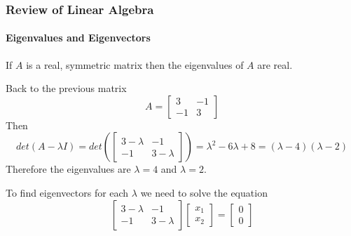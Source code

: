 \begin{frame}
\frametitle{Review of Linear Algebra}
\framesubtitle{Eigenvalues and Eigenvectors}
\begin{theorem}
If $A$ is a real, symmetric matrix then the eigenvalues of $A$ are real.
\end{theorem}
\begin{examp}
Back to the previous matrix
$$
A = \left[\begin{array}{rr}
3 & -1 \\ -1 & 3
\end{array}\right]
$$
Then
$$
det(A-\lambda I) = det( \left[\begin{array}{rr}
3 -\lambda & -1 \\ -1 & 3-\lambda
\end{array}\right] ) = \lambda^2 -6\lambda +8 = (\lambda-4)(\lambda-2)
$$
Therefore the eigenvalues are $\lambda=4$ and $\lambda=2$.

To find eigenvectors for each $\lambda$ we need to solve the equation
$$
\left[\begin{array}{rr}
3 -\lambda & -1 \\ -1 & 3-\lambda
\end{array}\right] \left[\begin{array}{c}
x_1 \\ x_2
\end{array}\right] = \left[\begin{array}{c}
0 \\ 0
\end{array}\right]
$$
\end{examp}
\end{frame}
